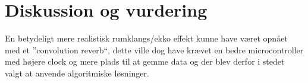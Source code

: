 \chapter{Diskussion og vurdering}\label{kap:diskussion}
\vspace*{.5cm}

En betydeligt mere realistisk rumklangs/ekko effekt kunne have været opnået med et ''convolution reverb``, dette ville dog have krævet en bedre microcontroller med højere clock og mere plads til at gemme data og der blev derfor i stedet valgt at anvende algoritmiske løsninger.



